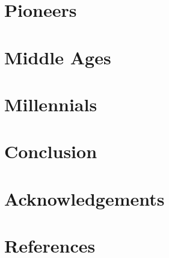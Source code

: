 \documentclass[twocolumn, switch]{article}
\begin{document}
\section{Pioneers} \label{sec:pioneers}
    
\lipsum[3]
\section{Middle Ages} \label{sec:midages}
\lipsum[3]
\section{Millennials} \label{sec:millennials}
\lipsum[3]
\section{Conclusion}
\lipsum[3]
\section*{Acknowledgements}
\lipsum[3]
\section*{References}
\lipsum[3]
\end{document}
